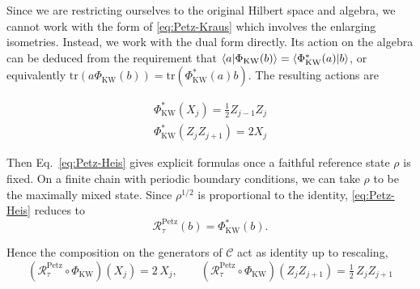 \documentclass{article}
\newcommand{\Tr}{\mathrm{tr}}
\theoremstyle{definition}
\begin{document}
  Since we are restricting ourselves to the original Hilbert space and algebra, we
  cannot work with the form of \ref{eq:Petz-Kraus} which involves the enlarging isometries.
  Instead, we work with the dual form directly. Its action on the algebra can be
  deduced from the requirement that
  $\braket{a|\Phi_\text{KW}(b)}= \braket{\Phi^*_{\text{KW}}(a)|b}$, or equivalently
  $\text{tr}( a\Phi_{\text{KW}}(b)) = \text{tr}(\Phi^{*}_{\text{KW}}(a)b)$. The
  resulting actions are





  \begin{eqnarray}
    \Phi^*_\text{KW}(X_j) = \frac{1}{2}Z_{j-1}Z_{j}\\
    \Phi^*_\text{KW}(Z_jZ_{j+1}) = 2X_j
  \end{eqnarray}

  Then Eq.~\eqref{eq:Petz-Heis} gives explicit formulas once a faithful
  reference state $\rho$ is fixed. On a finite chain with periodic boundary conditions,
  we can take $\rho$ to be the maximally mixed state. Since $\rho^{1/2}$ is proportional
  to the identity, \eqref{eq:Petz-Heis} reduces to
  \[
    \mathcal{R}^{\text{Petz}}_{\tau}(b)=\Phi_{\text{KW}}^{*}(b).
  \]

  Hence the composition on the generators of $\mathcal{C}$ act as identity up to
  rescaling,
  \begin{equation}
    \label{eq:tau-Petz-compose}(\mathcal{R}^{\text{Petz}}_{\tau}\!\circ\Phi_{\text{KW}}
    )(X_{j})=2\,X_{j},\qquad (\mathcal{R}^{\text{Petz}}_{\tau}\!\circ\Phi_{\text{KW}}
    )(Z_{j}Z_{j+1}) =\tfrac{1}{2}\,Z_{j}Z_{j+1}
  \end{equation}
\end{document}

